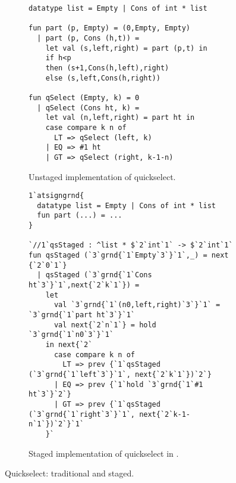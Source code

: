 
\begin{figure*}
\begin{subfigure}{0.5\textwidth}
\begin{lstlisting} 
datatype list = Empty | Cons of int * list

fun part (p, Empty) = (0,Empty, Empty) 
  | part (p, Cons (h,t)) = 
    let val (s,left,right) = part (p,t) in 
    if h<p 
    then (s+1,Cons(h,left),right) 
    else (s,left,Cons(h,right))

fun qSelect (Empty, k) = 0
  | qSelect (Cons ht, k) =
    let val (n,left,right) = part ht in
    case compare k n of
      LT => qSelect (left, k)
    | EQ => #1 ht
    | GT => qSelect (right, k-1-n)
\end{lstlisting}
\caption{Unstaged implementation of quickselect.}
\label{fig:qs-unstaged}
\end{subfigure}
\begin{subfigure}{0.5\textwidth}
\begin{lstlisting} 
1`atsigngrnd{
  datatype list = Empty | Cons of int * list
  fun part (...) = ...
} 

`//1`qsStaged : ^list * $`2`int`1` -> $`2`int`1`
fun qsStaged (`3`grnd{`1`Empty`3`}`1`,_) = next {`2`0`1`}
  | qsStaged (`3`grnd{`1`Cons ht`3`}`1`,next{`2`k`1`}) = 
    let 
      val `3`grnd{`1`(n0,left,right)`3`}`1` = `3`grnd{`1`part ht`3`}`1`
      val next{`2`n`1`} = hold `3`grnd{`1`n0`3`}`1`
    in next{`2`
      case compare k n of
        LT => prev {`1`qsStaged (`3`grnd{`1`left`3`}`1`, next{`2`k`1`})`2`}
      | EQ => prev {`1`hold `3`grnd{`1`#1 ht`3`}`2`}
      | GT => prev {`1`qsStaged (`3`grnd{`1`right`3`}`1`, next{`2`k-1-n`1`})`2`}`1`
    }`
\end{lstlisting}
\caption{Staged implementation of quickselect in \lang.}
\label{fig:qs-staged}
\end{subfigure}
\caption{Quickselect: traditional and staged.}
\end{figure*}


